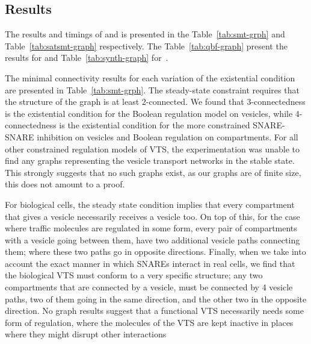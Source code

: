 \subsection{Results}
\noindent The results and timings of {\sattool} and {\smttool} is presented in the Table~\ref{tab:smt-grph} and Table~\ref{tab:satsmt-graph} respectively.
The Table~\ref{tab:qbf-graph} present the results for {\qbftool} and Table~\ref{tab:synth-graph} for~{\ourtool}.





The minimal connectivity results for each variation of the existential condition are presented in Table~\ref{tab:smt-grph}.
%
The steady-state constraint requires that the structure of the graph is at least 2-connected. 
%
We found that 3-connectedness is the existential condition for the Boolean regulation model on vesicles, while 4-connectedness is the existential condition for the more constrained SNARE-SNARE inhibition on vesicles and Boolean regulation on compartments.
%
For all other constrained regulation models of VTS, the experimentation was unable to find any graphs representing the vesicle transport networks in the stable state.
%
This strongly suggests that no such graphs exist, as our graphs are of finite size, this does not amount to a  proof. 

For biological cells, the steady state condition implies that every compartment that gives a vesicle necessarily receives a vesicle too.
%
On top of this, for the case where traffic molecules are regulated in some form, every pair of compartments with a vesicle going between them, have two additional vesicle paths connecting them; where these two paths go in opposite directions.
%
Finally, when we take into account the exact manner in which SNAREs interact in real cells, we find that the biological VTS must conform to a very specific structure; any two compartments that are connected by a vesicle, must be connected by 4 vesicle paths, two of them going in the same direction, and the other two in the opposite direction. 
%
No graph results suggest that a functional VTS necessarily needs some form of regulation, where the molecules of the VTS are kept inactive in places where they might disrupt other interactions


